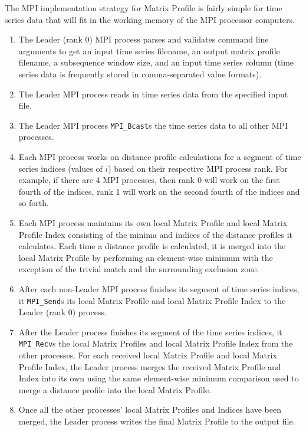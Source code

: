\documentclass[conference]{IEEEtran}
\begin{document}
The MPI implementation strategy for Matrix Profile is fairly simple for time series data that will fit in the working memory of the MPI processor computers.  
\begin{enumerate}
    \item The Leader (rank 0) MPI process parses and validates command line arguments to get an input time series filename, an output matrix profile filename, a subsequence window size, and an input time series column (time series data is frequently stored in comma-separated value formats).
    \item The Leader MPI process reads in time series data from the specified input file.
    \item The Leader MPI process \texttt{MPI\_Bcast}s the time series data to all other MPI processes.
    \item Each MPI process works on distance profile calculations for a segment of time series indices (values of $i$) based on their respective MPI process rank.  For example, if there are 4 MPI processes, then rank 0 will work on the first fourth of the indices, rank 1 will work on the second fourth of the indices and so forth. 
    \item Each MPI process maintains its own local Matrix Profile and local Matrix Profile Index consisting of the minima and indices of the distance profiles it calculates.  Each time a distance profile is calculated, it is merged into the local Matrix Profile by performing an element-wise minimum with the exception of the trivial match and the surrounding exclusion zone.
    \item After each non-Leader MPI process finishes its segment of time series indices, it \texttt{MPI\_Send}s its local Matrix Profile and local Matrix Profile Index to the Leader (rank 0) process.
    \item After the Leader process finishes its segment of the time series indices, it \texttt{MPI\_Recv}s the local Matrix Profiles and local Matrix Profile Index from the other processes.  For each received local Matrix Profile and local Matrix Profile Index, the Leader process merges the received Matrix Profile and Index into its own using the same element-wise minimum comparison used to merge a distance profile into the local Matrix Profile.
    \item Once all the other processes' local Matrix Profiles and Indices have been merged, the Leader process writes the final Matrix Profile to the output file.
\end{enumerate}
\end{document}
